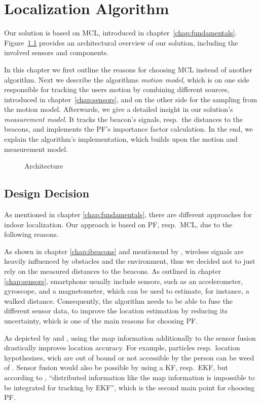 \chapter{Localization Algorithm} \label{chap:pf}
Our solution is based on \acl{MCL}, introduced in chapter~\ref{chap:fundamentals}. Figure~\ref{fig:algo_architecture} provides an architectural overview of our solution, including the involved sensors and components.

In this chapter we first outline the reasons for choosing \acs{MCL} instead of another algorithm. Next we describe the algorithms \emph{motion model}, which is on one side responsible for tracking the users motion by combining different sources, introduced in chapter~\ref{chap:sensors}, and on the other side for the sampling from the motion model. Afterwards, we give a detailed insight in our solution's \emph{measurement model}. It tracks the beacon's signals, resp.\ the distances to the beacons, and implements the \acs{PF}'s importance factor calculation. In the end, we explain the algorithm's implementation, which builds upon the motion and measurement model.

\begin{figure}
\def\svgwidth{0.9\textwidth}

\caption{Architecture}
\label{fig:algo_architecture}
\end{figure}


\section{Design Decision}
As mentioned in chapter \ref{chap:fundamentals}, there are different approaches for indoor localization. Our approach is based on \acl{PF}, resp.\ \acl{MCL}, due to the following reasons.

As shown in chapter \ref{chap:ibeacons} and mentionend by \citet{IEEE:survey_wireless_indoor_pos}, wireless signals are heavily influenced by obstacles and the environment, thus we decided not to just rely on the measured distances to the beacons. As outlined in chapter \ref{chap:sensors}, smartphone usually include sensors, such as an accelerometer, gyroscope, and a magnetometer, which can be used to estimate, for instance, a walked distance. Consequently, the algorithm needs to be able to fuse the different sensor data, to improve the location estimation by reducing its uncertainty, which is one of the main reasons for choosing \acs{PF}.

As depicted by \citet{siddiqi:experiments_mcl_wifi} and \citet{wang:wlan}, using the map information additionally to the sensor fusion drastically improves location accuracy. For example, particles resp.\ location hypothesizes, wich are out of bound or not accessible by the person can be weed of \citep{straub:pf,siddiqi:experiments_mcl_wifi}. Sensor fusion would also be possible by using a \acl{KF}, resp.\ \acs{EKF}, but according to \citet{wang:wlan}, ``distributed information like the map information is impossible to be integrated for tracking by \acs{EKF}'', which is the second main point for choosing \acs{PF}.

